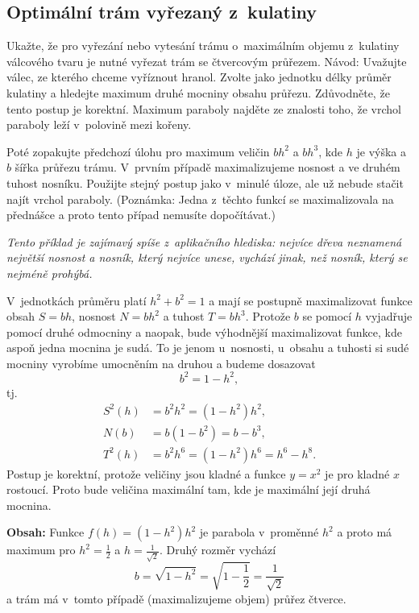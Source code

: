 \stranka

\subsection{Optimální trám vyřezaný z kulatiny}
Ukažte, že pro vyřezání nebo vytesání trámu o maximálním objemu z kulatiny válcového tvaru je nutné vyřezat trám se čtvercovým
průřezem. Návod: Uvažujte válec, ze kterého chceme vyříznout
hranol. Zvolte jako jednotku délky průměr kulatiny a hledejte maximum
druhé mocniny obsahu průřezu. Zdůvodněte, že tento postup je
korektní. Maximum paraboly najděte ze znalosti toho, že vrchol
paraboly leží v polovině mezi kořeny.

Poté zopakujte předchozí úlohu pro maximum veličin $bh^2$ a $bh^3$, kde $h$
je výška a $b$ šířka průřezu trámu. V prvním případě maximalizujeme
nosnost a ve druhém tuhost nosníku. Použijte stejný postup jako v minulé úloze, ale už nebude stačit najít vrchol paraboly. (Poznámka: Jedna z těchto funkcí se maximalizovala na přednášce a proto tento případ nemusíte dopočítávat.)

\textit{Tento příklad je zajímavý spíše z aplikačního hlediska: nejvíce dřeva neznamená největší nosnost a nosník, který nejvíce unese, vychází jinak, než nosník, který se nejméně prohýbá.}

\reseni

V jednotkách průměru platí $h^2+b^2=1$
a mají se postupně maximalizovat funkce obsah $S=bh$, nosnost $N=bh^2$ a tuhost $T=bh^3$. Protože $b$ se pomocí $h$ vyjadřuje pomocí druhé odmocniny a naopak, bude výhodnější maximalizovat funkce, kde aspoň jedna mocnina je sudá. To je jenom u nosnosti, u obsahu a tuhosti si sudé mocniny vyrobíme umocněním na druhou a budeme dosazovat $$b^2=1-h^2,$$ tj.
$$
\begin{aligned}
S^2(h)&=b^2h^2=(1-h^2)h^2,\\
N(b)&=b(1-b^2)=b-b^3,\\
T^2(h)&=b^2h^6=(1-h^2)h^6=h^6-h^8.
\end{aligned}
$$
Postup je korektní, protože veličiny jsou kladné a funkce $y=x^2$ je pro kladné $x$ rostoucí. Proto bude veličina maximální tam, kde je maximální její druhá mocnina.

\textbf{Obsah: }Funkce $f(h)=(1-h^2)h^2$ je parabola v proměnné $h^2$ a proto má maximum pro $h^2=\frac 12$ a $h=\frac {1}{\sqrt 2}$. Druhý rozměr vychází
$$b=\sqrt{1-h^2}=\sqrt{1-\frac 12}=\frac{1}{\sqrt 2}$$ a trám má v tomto případě (maximalizujeme objem) průřez čtverce.

